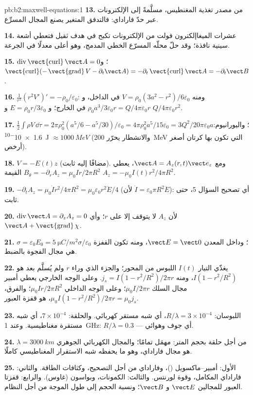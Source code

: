 \begin{solution}{pb:b2:maxwell-equations:1}
\textbf{13.} من مصدر تغذية المغنطيس، مسلَّمةً إلى الإلكترونات عبر
حدّ فاراداي: فالتدفق المتغير يصنع المجال المسرِّع.

\textbf{14.} عشرات الميغاإلكترون فولت من الإلكترونات تكبح في هدف ثقيل فتعطي
أشعة سينية نافذة؛ وقد حلّ محلّه المسرّع الخطي المدمج، وهو أعلى معدلًا
في الجرعة.

\textbf{15.} $\operatorname{div}\operatorname{\vect{curl}}\vect A = 0$؛ و $\operatorname{\vect{curl}}(-\operatorname{\vect{grad}}
V - \partial_t\vect A) = -\partial_t\operatorname{\vect{curl}}\vect A = -\partial_t\vect B$.

\textbf{16.} $\frac1{r^2}(r^2V')' = -\rho_0/\varepsilon_0$: ومنه $V = \rho_0(3a^2 - r^2)/6\varepsilon_0$
في الداخل، و $\rho_0a^3/3\varepsilon_0r = Q/4\pi\varepsilon_0r$ في الخارج؛ و $E = \rho_0r/3\varepsilon_0$ و
$Q/4\pi\varepsilon_0r^2$.

\textbf{17.} $\tfrac12\int\rho V\,\dd\tau = 2\pi\rho_0^2(a^5/6 - a^5/30)/\varepsilon_0 = 4\pi\rho_0^2a^5/
15\varepsilon_0 = 3Q^2/20\pi\varepsilon_0a$؛ واليورانيوم: \qty{1.6e-10}{J} $\approx \qty{1000}{MeV}$ (والانشطار
يحرّر \qty{200}{MeV} التي تكون بها كرتان أصغر أرخص).

\textbf{18.} $V = -E(t)z$ (مضافًا إليه ثابت). ومع $\vect A = A_z(r, t)\vect e_z$،
يعطي $B_\theta = -\partial_rA_z = \mu_0Ir/2\pi R^2$ القيمة $A_z = -\mu_0I(t)r^2/4\pi R^2$.

\textbf{19.} $-\partial_tA_z = \mu_0\dot Ir^2/4\pi R^2 = \mu_0\varepsilon_0r^2\ddot E/4$ (لأن $\dot I =
\varepsilon_0\pi R^2\ddot E$): أي تصحيح السؤال 5، حتى ثابت.

\textbf{20.} $\operatorname{div}\vect A = \partial_zA_z = 0$ لأن $A_z$ لا يتوقف إلا على $r$؛
وأي $\vect A + \operatorname{\vect{grad}}\chi$.

\textbf{21.} $\sigma = \varepsilon_0E_0 = \qty{5}{\micro C/m^2}$؛ وداخل المعدن $\vect E =
\vect 0$، ومنه تكون القفزة $\sigma/\varepsilon_0$ هي مجال الفجوة بالضبط.

\textbf{22.} يغذّي التيار $I(t)$ اللبوس من المحور؛ والجزء
الذي وراء $r$ ولم يُسلَّم بعد هو $I(1 - r^2/R^2)$، ومنه $j_s = I(1 -
r^2/R^2)/2\pi r$. وعلى الوجه الخارجي يعطي أمبير مجال السلك $\mu_0I/
2\pi r$؛ وعلى الوجه الداخلي $\mu_0Ir/2\pi R^2$؛ والفرق، $\mu_0I(1 -
r^2/R^2)/2\pi r = \mu_0j_s$، هو قفزة العبور.

\textbf{23.} اللبوسان: $R/\lambda = 3 \times 10^{-4}$، أي شبه مستقر كهربائي. والحلقة: $7 \times 10^{-4}$،
أي شبه مستقرة مغناطيسية. وعند \qty{1}{GHz}: $R/\lambda = 0.3$ --- أي جوف وهوائي.

\textbf{24.} $\lambda = \qty{3000}{km}$ من أجل حلقة بحجم المتر: 
مهمَل تمامًا؛ والمجال الكهربائي الجوهري هو
مجال فاراداي، وهو ما يحفظه شبه الاستقرار المغناطيسي كاملًا.

\textbf{25.} الأول: أمبير--ماكسويل ()، وفاراداي من أجل
التصحيح، وكثافات الطاقة. والثاني: فاراداي المكامل، وقوة لورنتس.
والثالث: الكمونات، وبواسون (غاوس). والرابع: قفزتا العبور للمجالين $\vect E$
و $\vect B$؛ ونسبة الحجم إلى طول الموجة من أجل النظام.
\end{solution}
